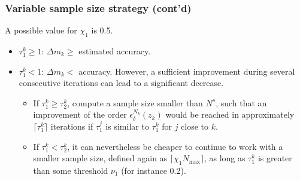 \documentclass[aspectratio=169]{beamer}
\begin{document}
\begin{frame}
\frametitle{Variable sample size strategy (cont'd)}

A possible value for $\chi_1$ is 0.5.

\begin{itemize}
	\item 
$\tau_1^k \geq 1$: $\Delta m_k \geq$ estimated accuracy.
\item
$\tau_1^k < 1$: $\Delta m_k <$ accuracy.
However, %
a sufficient improvement during several consecutive iterations can lead to a significant decrease.%
\begin{itemize}
\item 
If $\tau_1^k \geq \tau_2^k$, 
compute a sample size smaller than  $N^s$, such that an improvement of the order $\epsilon_\delta^{N_k}(z_k)$ would be reached in approximately $\lceil \tau_1^k \rceil$ iterations if $\tau_1^j$ is similar to $\tau_1^k$ for $j$ close to $k$.
\item
If $\tau_1^k < \tau_2^k$, it can nevertheless be cheaper to continue to work with a smaller sample size, defined again as $\lceil \chi_1 N_{\max} \rceil$, as long as $\tau_1^k$ is greater than some threshold $\nu_1$ (for instance 0.2).
\end{itemize}
\end{itemize}

\end{frame}
\end{document}
